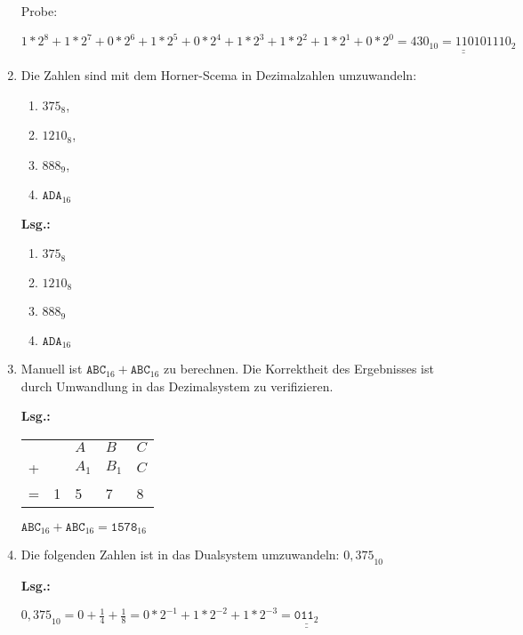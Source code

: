 \documentclass[12pt,a4paper]{scrreprt}
\newcommand{\Lsg}{\par \textbf{Lsg.: \hfill }}
\newcommand{\lsg}[1]{\underline{\underline{#1}}}
\begin{document}
\begin{enumerate}
Probe:

\begin{math}
 1*2^8
+1*2^7
+0*2^6
+1*2^5
+0*2^4
+1*2^3
+1*2^2
+1*2^1
+0*2^0
= \lsg{
	430_{10} = {110101110}_{2}
}
\end{math}


\item Die Zahlen sind mit dem Horner-Scema in Dezimalzahlen umzuwandeln: \begin{enumerate}
\item $375_8$,
\item $1210_8$,
\item $888_9$,
\item $\texttt{ADA}_{16}$
\end{enumerate}

\Lsg

\begin{enumerate}
\item $375_8$
\item $1210_8$
\item $888_9$
\item $\texttt{ADA}_{16}$
\end{enumerate}%

\item Manuell ist $\texttt{ABC}_{16} + \texttt{ABC}_{16}$ zu berechnen. Die Korrektheit des Ergebnisses ist durch Umwandlung in das Dezimalsystem zu verifizieren.

\Lsg

\begin{tabular}{lllll}
  & & $A$ & $B$ & $C$ \\
+ & & $A_{1}$ & $B_{1}$ & $C$ \\
\hline 
= & 1 & 5 & 7 & 8
\end{tabular}

$\texttt{ABC}_{16} + \texttt{ABC}_{16} = \texttt{1578}_{16}$

\item Die folgenden Zahlen ist in das Dualsystem umzuwandeln: ${0,375}_{10}$

\Lsg

\begin{math}
{0,375}_{10} = 
0 + \frac{1}{4} + \frac{1}{8} 
 = 0*2^{-1} + 1*2^{-2} + 1*2^{-3} = \lsg{
	\texttt{011}_{2}
}
\end{math}


\end{enumerate}
\end{document}
